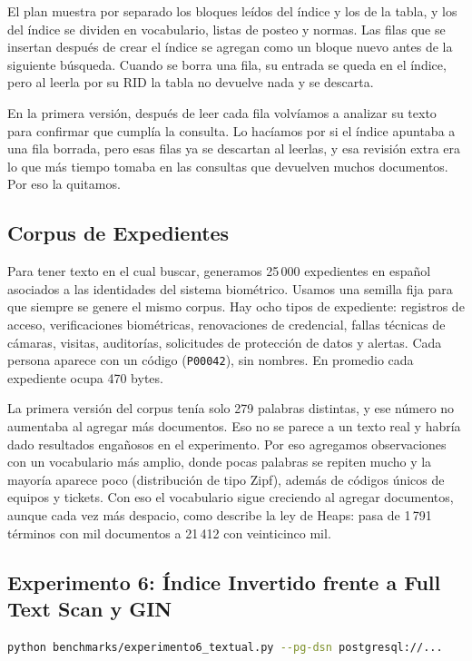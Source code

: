 El plan muestra por separado los bloques leídos del índice y los de la tabla, y
los del índice se dividen en vocabulario, listas de posteo y normas. Las filas
que se insertan después de crear el índice se agregan como un bloque nuevo antes
de la siguiente búsqueda. Cuando se borra una fila, su entrada se queda en el
índice, pero al leerla por su RID la tabla no devuelve nada y se descarta.

En la primera versión, después de leer cada fila volvíamos a analizar su texto
para confirmar que cumplía la consulta. Lo hacíamos por si el índice apuntaba a
una fila borrada, pero esas filas ya se descartan al leerlas, y esa revisión
extra era lo que más tiempo tomaba en las consultas que devuelven muchos
documentos. Por eso la quitamos.

\subsection{Corpus de Expedientes}

Para tener texto en el cual buscar, generamos 25\,000 expedientes en español
asociados a las identidades del sistema biométrico. Usamos una semilla fija para
que siempre se genere el mismo corpus. Hay ocho tipos de expediente: registros
de acceso, verificaciones biométricas, renovaciones de credencial, fallas
técnicas de cámaras, visitas, auditorías, solicitudes de protección de datos y
alertas. Cada persona aparece con un código (\texttt{P00042}), sin nombres. En
promedio cada expediente ocupa 470 bytes.

La primera versión del corpus tenía solo 279 palabras distintas, y ese número no
aumentaba al agregar más documentos. Eso no se parece a un texto real y habría
dado resultados engañosos en el experimento. Por eso agregamos observaciones con
un vocabulario más amplio, donde pocas palabras se repiten mucho y la mayoría
aparece poco (distribución de tipo Zipf), además de códigos únicos de equipos y
tickets. Con eso el vocabulario sigue creciendo al agregar documentos, aunque
cada vez más despacio, como describe la ley de Heaps: pasa de 1\,791 términos
con mil documentos a 21\,412 con veinticinco mil.

\subsection{Experimento 6: Índice Invertido frente a Full Text Scan y GIN}

\begin{lstlisting}[language=bash, caption={Ejecución del experimento}]
python benchmarks/experimento6_textual.py --pg-dsn postgresql://...
\end{lstlisting}

